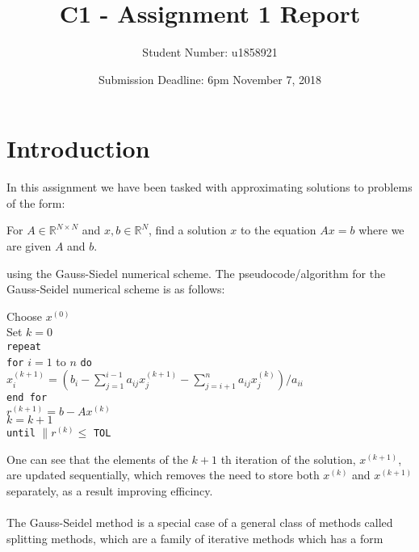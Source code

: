\documentclass[a4paper,11pt]{article}
\title{C1 - Assignment 1 Report}
\author{Student Number: u1858921}
\date{Submission Deadline: 6pm November 7, 2018}
\theoremstyle{break}
\theoremstyle{break2}
\theoremstyle{break}
\theoremstyle{break2}
\newcommand{\R}{\mathbb{R}}
\begin{document}
	\maketitle
	\tableofcontents
%

\section{Introduction}
In this assignment we have been tasked with approximating solutions to problems of the form:
\begin{mdframed}[topline=false,bottomline=false,rightline=false,leftline=false]
	For $ A \in \R^{N \times N} $ and $ x,b \in \R^N $, find a solution $ x $ to the equation $ Ax = b $ where we are given $ A $ and $ b $.
\end{mdframed}
using the Gauss-Siedel numerical scheme. The pseudocode/algorithm for the Gauss-Seidel numerical scheme is as follows:
\begin{mdframed}
	Choose $ x^{(0)} $\\
	Set $ k = 0 $ \\
	\texttt{repeat}\\
	\hspace*{15pt}\texttt{for} $ i = 1 $ to $ n $ \texttt{do}\\
	\hspace*{30pt}$ x_i^{(k+1)} = \left(b_i - \sum_{j=1}^{i-1}a_{ij}x_j^{(k+1)} - \sum_{j=i+1}^{n}a_{ij}x_j^{(k)}\right)/a_{ii} $\\
	\hspace*{15pt}\texttt{end for}\\
	\hspace*{15pt}$ r^{(k+1)} = b - Ax^{(k)} $ \\
	\hspace*{15pt}$ k = k + 1 $ \\
	\texttt{until} $ \|r^{(k)} \leq $ \texttt{TOL}
\end{mdframed}
One can see that the elements of the $ k+1 $ th iteration of the solution, $ x^{(k+1)} $, are updated sequentially, which removes the need to store both $ x^{(k)} $ and $ x^{(k+1)} $ separately, as a result improving efficincy. \\\\
\noindent
The Gauss-Seidel method is a special case of a general class of methods called splitting methods, which are a family of iterative methods which has a form
\end{document}
